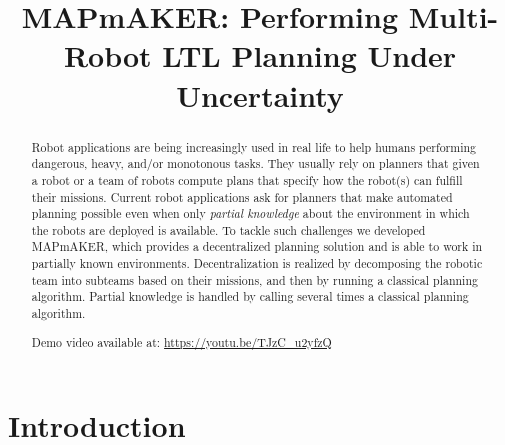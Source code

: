 \documentclass[10pt,conference]{IEEEtran}
\newcommand\patrizio[1]{\nb{Patrizio}{#1}}
\newcommand\claudio[1]{\nb{Claudio}{#1}}
\newcommand{\ra}{$\rightarrow$}
\newcommand{\chg}[2]{\textcolor{red}{\sout{#1}}{\ra}\textcolor{blue}{\uline{#2}}} %
\newcommand{\toolName}{MAPmAKER}
\begin{document}
	
	
	\title{MAPmAKER: Performing Multi-Robot LTL Planning Under Uncertainty}

	
	\author{
	}	
	
	\maketitle

	\begin{abstract}
		Robot applications are being increasingly used in real life to help humans performing dangerous, heavy, and/or monotonous tasks.
		They usually rely on planners that given a robot or a team of robots compute plans that specify how the robot(s) can fulfill their missions.
		Current robot applications ask for planners that make automated planning 
		possible even when only \emph{partial knowledge} about the environment in which the robots are deployed is available.
		To tackle such challenges we developed \toolName, %
		which provides a decentralized planning solution  and  is able to work in partially known environments.
		Decentralization is realized by decomposing the robotic team into subteams based on their missions, %
		and then by running a classical planning algorithm.
		Partial knowledge is handled by calling several times  a classical planning algorithm.
		
		Demo video available at: \url{https://youtu.be/TJzC_u2yfzQ}
	\end{abstract}
	
	\section{Introduction}
	
	
\end{document}
